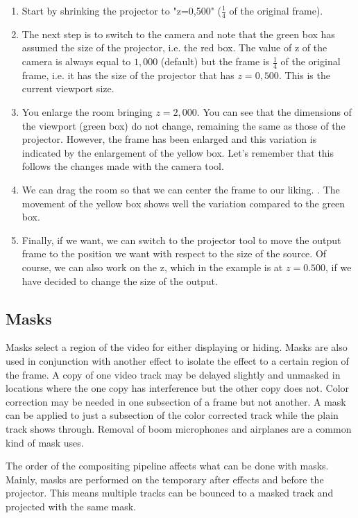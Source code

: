 \begin{enumerate}
    \item Start by shrinking the projector to "z=0,500" ($\frac{1}{4}$ of the original frame).
    \item The next step is to switch to the camera and note that the green box has assumed the size of the projector, i.e. the red box. The value of z of the camera is always equal to $1,000$ (default) but the frame is $\frac{1}{4}$ of the original frame, i.e. it has the size of the projector that has $z=0,500$. This is the current viewport size.
    \item You enlarge the room bringing $z=2,000$. You can see that the dimensions of the viewport (green box) do not change, remaining the same as those of the projector. However, the frame has been enlarged and this variation is indicated by the enlargement of the yellow box. Let's remember that this follows the changes made with the camera tool.
    \item We can drag the room so that we can center the frame to our liking. . The movement of the yellow box shows well the variation compared to the green box.
    \item Finally, if we want, we can switch to the projector tool to move the output frame to the position we want with respect to the size of the source. Of course, we can also work on the z, which in the example is at $z=0.500$, if we have decided to change the size of the output.
\end{enumerate}

\subsection{Masks}%
\label{sub:masks}

Masks select a region of the video for either displaying or hiding. 
Masks are also used in conjunction with another effect to isolate the effect to a certain region of the frame. 
A copy of one video track may be delayed slightly and unmasked in locations where the one copy has interference but the other copy does not. 
Color correction may be needed in one subsection of a frame but not another. 
A mask can be applied to just a subsection of the color corrected track while the plain track shows through. 
Removal of boom microphones and airplanes are a common kind of mask uses.

The order of the compositing pipeline affects what can be done with masks. Mainly, masks are performed on the temporary after effects and before the projector. This means multiple tracks can be bounced to a masked track and projected with the same mask.

